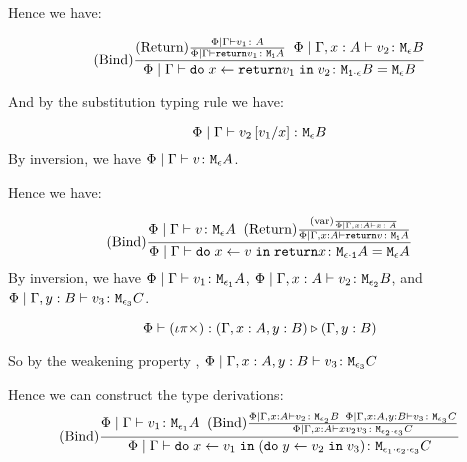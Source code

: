 {        Hence we have:


        \begin{equation}
            \treerule{Bind}{\treerule{Return}{\gpetyperelation{v_1}{A}}{\gpetyperelation{\return{v_1}}{\moa}}\s\s\etyperelation{\P}{\gax}{v_2}{\meb}}{\gpetyperelation{\doin{x}{\return{v_1}}{v_2}}{\M{\1\dot\e}{B} = \meb}}
        \end{equation}

        And by the substitution typing rule we have: 

        \begin{equation}
            \gpetyperelation{v_2\ssub{x}{v_1}}{\meb}
        \end{equation}
        By inversion, we have $\gpetyperelation{v}{\mea}$.

        Hence we have:

        \begin{equation}
            \treerule{Bind}{
                \gpetyperelation{v}{\mea}
                \s\s
                \treerule{Return}{\treerule{var}{}{\etyperelation{\P}{\gax}{x}{A}}}{\etyperelation{\P}{\gax}{\return{v}}{\moa}}
            }{\gpetyperelation{\doin{x}{v}{\return{x}}}{\M{\e\dot\1}{A} = \mea}}
        \end{equation}
        By inversion, we have $\gpetyperelation{v_1}{\M{\e_1}{A}}$, $\etyperelation{\P}{\gax}{v_2}{\M{\e_2}{B}}$, and $\etyperelation{\P}{\gby}{v_3}{\M{\e_3}{C}}$.

       
        
        $$\pewrel{(\i\pi\times)}{(\gax, y: B)}{(\gby)}$$

        So by the weakening property , $\etyperelation{\P}{\gax, y: B}{v_3}{\M{\e_3}{C}}$

        Hence we can construct the type derivations:
        \begin{equation} 
            \treerule{Bind}{
                \gpetyperelation{v_1}{\M{\e_1}{A}}
                \s\s
                \treerule{Bind}{
                    \etyperelation{\P}{\gax}{v_2}{\M{\e_2}{B}}
                    \s\s
                    \etyperelation{\P}{\gax, y: B}{v_3}{\M{\e_3}{C}}
                }{
                    \etyperelation{\P}{\gax}{\do{x}{v_2}{v_3}}{\M{\e_2 \dot \e_3}{C}}
                }
            }{
                \gpetyperelation{
                    \doin{x}{v_1}{
                        (\doin{y}{v_2}{v_3})
                    }
                }{
                    \M{\e_1\dot\e_2\dot\e_3}{C}
                }
            }
        \end{equation}

}
